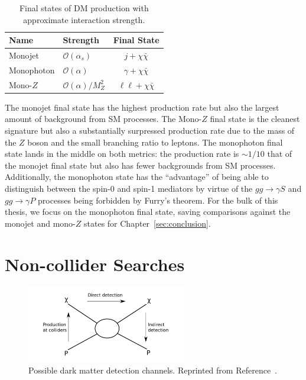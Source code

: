 \begin{table}[htbp]
\centering
\caption{
  Final states of DM production with approximate interaction strength.
}
\label{tab:monox}
\begin{tabular}{ l|l|c }
  Name & Strength & Final State \\
  \hline
  Monojet & $\mathcal{O}(\alpha_s)$ & $j+\chi\bar\chi$ \\
  Monophoton & $\mathcal{O}(\alpha)$ & $\gamma+\chi\bar\chi$ \\
  Mono-$Z$ & $\mathcal{O}(\alpha)/M_Z^2$ & $\ell\ell+\chi\bar\chi$ \\
\end{tabular}
\end{table}

The monojet final state has the highest production rate but also the largest amount of background from SM processes.
The Mono-$Z$ final state is the cleanest signature but also a substantially surpressed production rate due to the mass of the $Z$ boson and the small branching ratio to leptons.
The monophoton final state lands in the middle on both metrics: the production rate is $\sim 1/10$ that of the monojet final state but also has fewer backgrounds from SM processes.
Additionally, the monophoton state has the ``advantage'' of being able to distinguish between the spin-0 and spin-1 mediators by virtue of the $gg \rightarrow \gamma S$ and $gg \rightarrow \gamma P$ processes being forbidden by Furry's theorem.
For the bulk of this thesis, we focus on the monophoton final state, saving comparisons against the monojet and mono-$Z$ states for Chapter~\ref{sec:conclusion}. 

\section{Non-collider Searches}
\label{sec:dm_search}

\begin{figure}[htbp]
  \centering
  \includegraphics[width=0.625\textwidth]{DarkMatter/Figures/dm_box.png}
  \caption{
    Possible dark matter detection channels.
    Reprinted from Reference~\cite{}. %
  }
  \label{fig:dm_box}
\end{figure}

